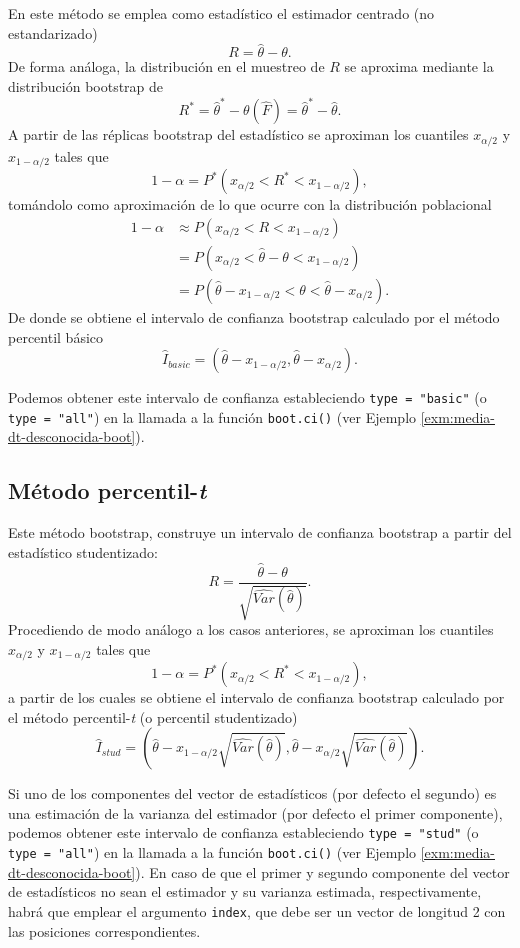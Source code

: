 \documentclass[
]{book}
\theoremstyle{break}
\theoremstyle{nonumberplain}
\begin{document}
En este método se emplea como estadístico el estimador centrado (no estandarizado)
\[R = \hat{\theta}-\theta.\]
De forma análoga, la distribución en el muestreo de \(R\) se aproxima mediante la distribución bootstrap de
\[R^{\ast}= \hat{\theta}^{\ast}-\theta \left( \hat{F} \right) = \hat{\theta}^{\ast}-\hat{\theta}.\]
A partir de las réplicas bootstrap del estadístico se aproximan los cuantiles \(x_{\alpha /2}\) y \(x_{1-\alpha /2}\) tales que
\[1-\alpha = P^{\ast}\left( x_{\alpha /2}<R^{\ast}<x_{1-\alpha /2} \right),\]
tomándolo como aproximación de lo que ocurre con la distribución poblacional
\[\begin{aligned}
1-\alpha &\approx P\left( x_{\alpha /2}<R<x_{1-\alpha /2} \right) \\
&= P\left( x_{\alpha /2} < \hat{\theta}-\theta < x_{1-\alpha /2} \right) \\
&= P\left( \hat{\theta} - x_{1-\alpha /2} < \theta <\hat{\theta} -x_{\alpha /2} \right).
\end{aligned}\]
De donde se obtiene el intervalo de confianza bootstrap calculado
por el método percentil básico
\[\hat{I}_{basic}=\left( \hat{\theta} - x_{1-\alpha /2},\hat{\theta} - x_{\alpha /2} \right).\]

Podemos obtener este intervalo de confianza estableciendo \texttt{type\ =\ "basic"} (o \texttt{type\ =\ "all"}) en la llamada a la función \texttt{boot.ci()} (ver Ejemplo \ref{exm:media-dt-desconocida-boot}).

\hypertarget{boot-ic-stud}{%
\subsection{\texorpdfstring{Método percentil-\emph{t}}{Método percentil-t}}\label{boot-ic-stud}}

Este método bootstrap, construye un intervalo de confianza bootstrap a partir del estadístico studentizado:
\[R = \frac{\hat \theta - \theta}{\sqrt{\widehat{Var}(\hat \theta)}}.\]
Procediendo de modo análogo a los casos anteriores, se aproximan los cuantiles \(x_{\alpha /2}\) y \(x_{1-\alpha /2}\) tales que
\[1-\alpha = P^{\ast}\left( x_{\alpha /2}<R^{\ast}<x_{1-\alpha /2} \right),\]
a partir de los cuales se obtiene el intervalo de confianza bootstrap calculado
por el método percentil-\emph{t} (o percentil studentizado)
\[\hat{I}_{stud}=\left( \hat{\theta} - x_{1-\alpha /2}\sqrt{\widehat{Var}(\hat \theta)},\hat{\theta} - x_{\alpha /2}\sqrt{\widehat{Var}(\hat \theta)} \right).\]

Si uno de los componentes del vector de estadísticos (por defecto el segundo) es una estimación de la varianza del estimador (por defecto el primer componente), podemos obtener este intervalo de confianza estableciendo \texttt{type\ =\ "stud"} (o \texttt{type\ =\ "all"}) en la llamada a la función \texttt{boot.ci()} (ver Ejemplo \ref{exm:media-dt-desconocida-boot}).
En caso de que el primer y segundo componente del vector de estadísticos no sean el estimador y su varianza estimada, respectivamente, habrá que emplear el argumento \texttt{index}, que debe ser un vector de longitud 2 con las posiciones correspondientes.
\end{document}
